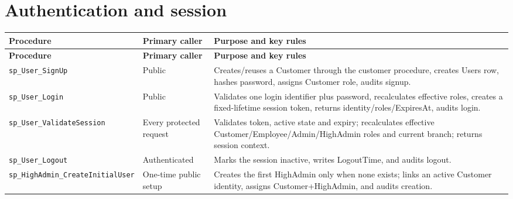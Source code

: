 \documentclass[11pt,a4paper,oneside]{report}
\begin{document}
\section{Authentication and session}
\begingroup
\footnotesize
\setlength{\tabcolsep}{4pt}
\renewcommand{\arraystretch}{1.08}
\begin{longtable}{L{0.30\textwidth}L{0.22\textwidth}L{0.41\textwidth}}
\toprule\textbf{Procedure} & \textbf{Primary caller} & \textbf{Purpose and key rules}\\\midrule\endfirsthead
\toprule\textbf{Procedure} & \textbf{Primary caller} & \textbf{Purpose and key rules}\\\midrule\endhead
\nolinkurl{sp_User_SignUp} & Public & Creates\slash reuses a Customer through the customer procedure, creates Users row, hashes password, assigns Customer role, audits signup.\\
\nolinkurl{sp_User_Login} & Public & Validates one login identifier plus password, recalculates effective roles, creates a fixed-lifetime session token, returns identity\slash roles\slash ExpiresAt, audits login.\\
\nolinkurl{sp_User_ValidateSession} & Every protected request & Validates token, active state and expiry; recalculates effective Customer\slash Employee\slash Admin\slash HighAdmin roles and current branch; returns session context.\\
\nolinkurl{sp_User_Logout} & Authenticated & Marks the session inactive, writes LogoutTime, and audits logout.\\
\nolinkurl{sp_HighAdmin_CreateInitialUser} & One-time public setup & Creates the first HighAdmin only when none exists; links an active Customer identity, assigns Customer+HighAdmin, and audits creation.\\
\bottomrule
\end{longtable}
\endgroup
\end{document}
